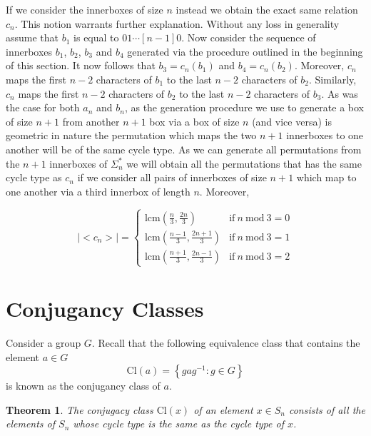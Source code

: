 \documentclass[a4paper,10pt]{article}
\newtheorem{theorem}{Theorem}
\begin{document}
If we consider the innerboxes of size $n$ instead we obtain the exact same relation $c_n$. This notion warrants further explanation. Without any loss in generality assume that $b_1$ is equal to $01\cdots[n-1]0$. Now consider the sequence of innerboxes $b_1$, $b_2$, $b_3$ and $b_4$ generated via the procedure outlined in the beginning of this section. It now follows that $b_3 = c_n(b_1)$ and $b_4 = c_n(b_2)$. Moreover, $c_n$ maps the first $n-2$ characters of $b_1$ to the last $n-2$ characters of $b_2$. Similarly, $c_n$ maps the first $n-2$ characters of $b_2$ to the last $n-2$ characters of $b_3$. As was the case for both $a_n$ and $b_n$, as the generation procedure we use to generate a box of size $n+1$ from another $n+1$ box via a box of size $n$ (and vice versa) is geometric in nature the permutation which maps the two $n+1$ innerboxes to one another will be of the same cycle type. As we can generate all permutations from the $n+1$ innerboxes of $\Sigma_n^*$ we will obtain all the permutations that has the same cycle type as $c_n$ if we consider all pairs of innerboxes of size $n+1$ which map to one another via a third innerbox of length $n$. Moreover,

\begin{equation}
|\!\!<\!\!c_n\!\!>\!\!|= \left\{
\begin{array}{ll}
\textrm{lcm}(\frac{n}{3},\frac{2n}{3}) &\textrm{if}~n~\textrm{mod}~3=0\\
\textrm{lcm}(\frac{n-1}{3},\frac{2n+1}{3}) &\textrm{if}~n~\textrm{mod}~3=1\\
\textrm{lcm}(\frac{n+1}{3},\frac{2n-1}{3}) &\textrm{if}~n~\textrm{mod}~3=2
\end{array}
\right.
\end{equation}

\section{Conjugancy Classes}
Consider a group $G$. Recall that the following equivalence class that contains the element $a\in G$
\begin{equation}
 \textrm{Cl} (a)=\left\{gag^{-1}:g\in G\right\}
\end{equation}
is known as the conjugancy class of $a$. 

\begin{theorem}
The conjugacy class $\textrm{Cl}(x)$ of an element $x \in S_n$ consists of all the elements of $S_n$ whose cycle type is the same as the cycle type of $x$.  
\end{theorem}
\end{document}
